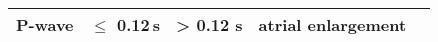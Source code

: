 \begin{table*}[]
{\begin{tabular}{|c|c|c|c|c|}
			P-wave                                                               & $\leq$
			0.12 s                                        & > 0.12 s                               
			& atrial enlargement                                                 
			& \cite{hampton2019ecg}         \\ \hline
		\end{tabular}
	}
	\vspace{-1em}
	\label{table:abnormal}
\end{table*}